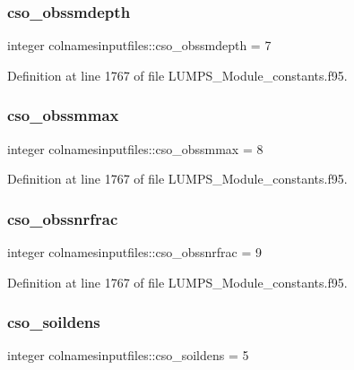 \subsubsection{\texorpdfstring{cso\+\_\+obssmdepth}{cso\_obssmdepth}}
{\footnotesize\ttfamily integer colnamesinputfiles\+::cso\+\_\+obssmdepth = 7}



Definition at line 1767 of file L\+U\+M\+P\+S\+\_\+\+Module\+\_\+constants.\+f95.

\mbox{\label{namespacecolnamesinputfiles_a99244bb6c133e30d823031ec8c1f7067}} 
\subsubsection{\texorpdfstring{cso\+\_\+obssmmax}{cso\_obssmmax}}
{\footnotesize\ttfamily integer colnamesinputfiles\+::cso\+\_\+obssmmax = 8}



Definition at line 1767 of file L\+U\+M\+P\+S\+\_\+\+Module\+\_\+constants.\+f95.

\mbox{\label{namespacecolnamesinputfiles_ad5679a32c978e147737a5d21fa736281}} 
\subsubsection{\texorpdfstring{cso\+\_\+obssnrfrac}{cso\_obssnrfrac}}
{\footnotesize\ttfamily integer colnamesinputfiles\+::cso\+\_\+obssnrfrac = 9}



Definition at line 1767 of file L\+U\+M\+P\+S\+\_\+\+Module\+\_\+constants.\+f95.

\mbox{\label{namespacecolnamesinputfiles_aabee2fa19a7eb7a83e16ea233911bad0}} 
\subsubsection{\texorpdfstring{cso\+\_\+soildens}{cso\_soildens}}
{\footnotesize\ttfamily integer colnamesinputfiles\+::cso\+\_\+soildens = 5}



